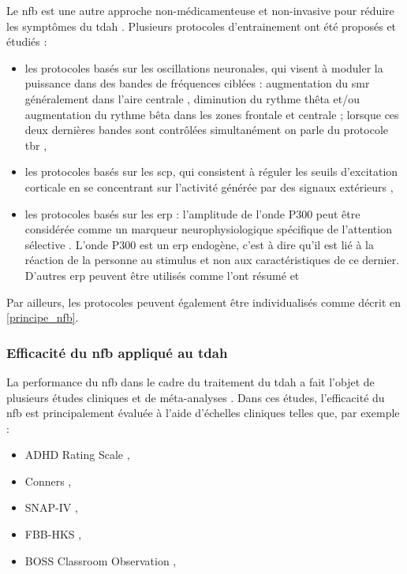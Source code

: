 Le \gls{nfb} est une autre approche non-médicamenteuse et non-invasive pour réduire les symptômes du \gls{tdah} \citep{Arns2015, Marzbani2016}.  
Plusieurs protocoles d'entrainement ont été proposés et étudiés :
\begin{itemize}
\item les protocoles basés sur les oscillations neuronales, qui visent à moduler la puissance dans des bandes de fréquences ciblées : augmentation du 
\gls{smr} généralement dans l'aire centrale \citep{Beauregard2006}, diminution du rythme thêta et/ou augmentation du rythme bêta dans les 
zones frontale et centrale \citep{Arns2015, Kropotov2005} ; lorsque ces deux dernières bandes sont contrôlées simultanément on parle du protocole 
\gls{tbr} \citep{Lubar1976, Arns2013}, 
\item les protocoles basés sur les \gls{scp}, qui consistent à réguler les seuils d'excitation corticale en se concentrant sur l'activité 
générée par des signaux extérieurs \citep{Heinrich2004, Banaschewski2007},
\item les protocoles basés sur les \gls{erp} : l'amplitude de l'onde P300 peut être considérée comme un marqueur neurophysiologique spécifique de l'attention 
sélective \citep{Desain2012, Fouillen2017, Arvaneh2019}. L'onde P300 est un \gls{erp} endogène, c'est à dire qu'il est lié à la réaction de la personne au stimulus et non aux 
caractéristiques de ce dernier. D'autres \gls{erp} peuvent être utilisés comme l'ont résumé \citet{Johnstone2013} et \citet{Barry2003erp}
\end{itemize}

Par ailleurs, les protocoles peuvent également être individualisés comme décrit en \ref{principe_nfb}.

\subsubsection{Efficacité du \gls{nfb} appliqué au \gls{tdah}}

La performance du \gls{nfb} dans le cadre du traitement du \gls{tdah} a fait l'objet de plusieurs études cliniques \citep{Escolano2014, Maurizio2014, Strehl2017} 
et de méta-analyses \citep{Arns2009, Arns2013, Sonuga-Barke2013, Micoulaud2014, Cortese2016, Catala2017, Lambez2019}. Dans ces études, l'efficacité du \gls{nfb} est 
principalement évaluée à l'aide d'échelles cliniques telles que, par exemple :
\begin{itemize}
\item ADHD Rating Scale \citep{Pappas2006},
\item Conners \citep{Conners2008},
\item SNAP-IV \citep{Bussing2008},
\item FBB-HKS \citep{Breuer2009},
\item BOSS Classroom Observation \citep{Shapiro2010}, 
\end{itemize}

